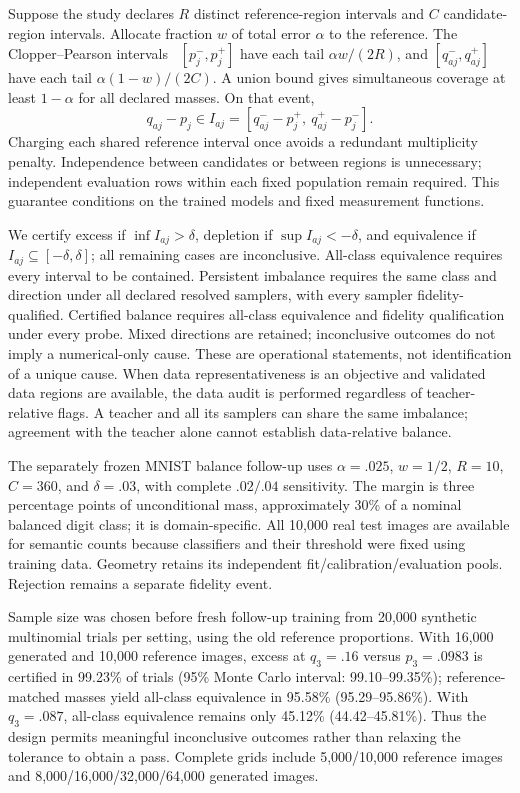 Suppose the study declares $R$ distinct reference-region intervals and $C$
candidate-region intervals. Allocate fraction $w$ of total error $\alpha$ to
the reference. The Clopper--Pearson intervals~\cite{clopper1934confidence}
$[p_j^-,p_j^+]$ have each tail $\alpha w/(2R)$, and
$[q_{aj}^-,q_{aj}^+]$ have each tail $\alpha(1-w)/(2C)$.
A union bound gives simultaneous coverage at least $1-\alpha$ for all
declared masses. On that event,
\begin{equation}
q_{aj}-p_j\in I_{aj}
=[q_{aj}^- -p_j^+,\ q_{aj}^+-p_j^-].
\label{eq:supp_shared_mass_difference}
\end{equation}
Charging each shared reference interval once avoids a redundant multiplicity
penalty. Independence between candidates or between regions is unnecessary;
independent evaluation rows within each fixed population remain required.
This guarantee conditions on the trained models and fixed measurement functions.

We certify excess if $\inf I_{aj}>\delta$, depletion if
$\sup I_{aj}<-\delta$, and equivalence if
$I_{aj}\subseteq[-\delta,\delta]$; all remaining cases are inconclusive.
All-class equivalence requires every interval to be contained. Persistent
imbalance requires the same class and direction under all declared resolved
samplers, with every sampler fidelity-qualified. Certified balance requires
all-class equivalence and fidelity qualification under every probe. Mixed
directions are retained; inconclusive outcomes do not imply a numerical-only
cause. These are operational statements, not identification of a unique cause.
When data representativeness is an objective and validated data regions are
available, the data audit is performed regardless of teacher-relative flags.
A teacher and all its samplers can share the same imbalance; agreement with
the teacher alone cannot establish data-relative balance.

The separately frozen MNIST balance follow-up uses $\alpha=.025$, $w=1/2$,
$R=10$, $C=360$, and $\delta=.03$, with complete $.02/.04$ sensitivity.
The margin is three percentage points of unconditional mass, approximately
30\% of a nominal balanced digit class; it is domain-specific. All 10,000 real
test images are available for semantic counts because classifiers and their
threshold were fixed using training data. Geometry retains its independent
fit/calibration/evaluation pools. Rejection remains a separate fidelity event.

Sample size was chosen before fresh follow-up training from 20,000 synthetic
multinomial trials per setting, using the old reference proportions. With
16,000 generated and 10,000 reference images, excess at $q_3=.16$ versus
$p_3=.0983$ is certified in 99.23\% of trials
(95\% Monte Carlo interval: 99.10--99.35\%); reference-matched masses yield
all-class equivalence in 95.58\% (95.29--95.86\%). With $q_3=.087$, all-class
equivalence remains only 45.12\% (44.42--45.81\%). Thus the design permits
meaningful inconclusive outcomes rather than relaxing the tolerance to obtain
a pass. Complete grids include 5,000/10,000 reference images and
8,000/16,000/32,000/64,000 generated images.

